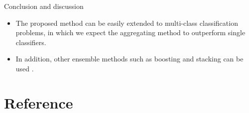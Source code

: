 \documentclass{beamer}
\begin{document}
\begin{frame}{Conclusion and discussion}
	\begin{itemize}
		\item{
			The proposed method can be easily extended to multi-class classification problems, in which we expect the aggregating method to outperform single classifiers. 
		}
		\item{
			In addition, other ensemble methods such as boosting and stacking can be used \citep{Opitz1999}.
		}
	\end{itemize}
\end{frame}



\section*{Reference}
\end{document}
